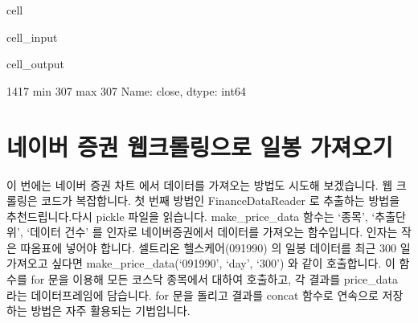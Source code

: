 \documentclass[letterpaper,10pt,english]{jupyterBook}
\begin{document}
\begin{sphinxuseclass}{cell}\begin{sphinxVerbatimInput}

\begin{sphinxuseclass}{cell_input}
\begin{sphinxVerbatim}[commandchars=\\\{\}]
\PYG{p}{[}\PYG{p}{]}
\PYG{p}{[}\PYG{p}{]}\PYG{p}{[}\PYG{p}{]}
\end{sphinxVerbatim}

\end{sphinxuseclass}\end{sphinxVerbatimInput}
\begin{sphinxVerbatimOutput}

\begin{sphinxuseclass}{cell_output}
\begin{sphinxVerbatim}[commandchars=\\\{\}]
1417
min    307
max    307
Name: close, dtype: int64
\end{sphinxVerbatim}

\end{sphinxuseclass}\end{sphinxVerbatimOutput}

\end{sphinxuseclass}



\part{네이버 증권 웹크롤링으로 일봉 가져오기}
\label{\detokenize{chapter4/4.4.1_Data_Collection:id1}}
\sphinxAtStartPar
이 번에는 네이버 증권 차트  에서 데이터를 가져오는 방법도 시도해 보겠습니다. 웹 크롤링은 코드가 복잡합니다. 첫 번째 방법인 FinanceDataReader 로 추출하는 방법을 추천드립니다.다시 pickle 파일을 읽습니다. make\_price\_data 함수는 ‘종목’, ‘추출단위’, ‘데이터 건수’ 를 인자로 네이버증권에서 데이터를 가져오는 함수입니다. 인자는 작은 따옴표에 넣어야 합니다. 셀트리온 헬스케어(091990) 의 일봉 데이터를 최근 300 일 가져오고 싶다면  make\_price\_data(‘091990’, ‘day’, ‘300’) 와 같이 호출합니다. 이 함수를 for 문을 이용해 모든 코스닥 종목에서 대하여 호출하고, 각 결과를 price\_data 라는 데이터프레임에 담습니다.
for 문을 돌리고 결과를 concat 함수로 연속으로 저장하는 방법은 자주 활용되는 기법입니다.
\end{document}
